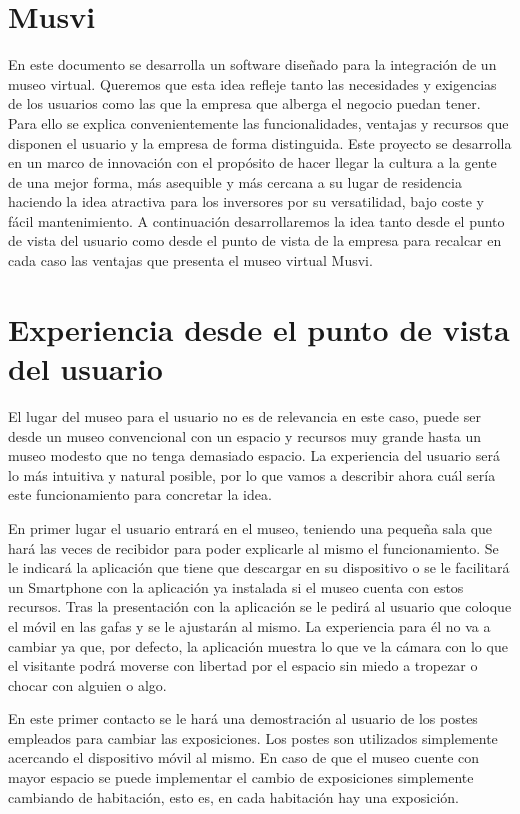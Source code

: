 \documentclass[a4paper,11pt]{article}
\begin{document}
\newpage

\tableofcontents

\newpage

\section{Musvi}
En este documento se desarrolla un software diseñado para la integración de un museo virtual. Queremos que esta idea refleje tanto las necesidades y exigencias de los usuarios como las que la empresa que alberga el negocio puedan tener. Para ello se explica convenientemente las funcionalidades, ventajas y recursos que disponen el usuario y la empresa de forma distinguida. Este proyecto se desarrolla en un marco de innovación con el propósito de hacer llegar la cultura a la gente de una mejor forma, más asequible y más cercana a su lugar de residencia haciendo la idea atractiva para los inversores por su versatilidad, bajo coste y fácil mantenimiento. A continuación desarrollaremos la idea tanto desde el punto de vista del usuario como desde el punto de vista de la empresa para recalcar en cada caso las ventajas que presenta el museo virtual Musvi.

\section{Experiencia desde el punto de vista del usuario}
El lugar del museo para el usuario no es de relevancia en este caso, puede ser desde un museo convencional con un espacio y recursos muy grande hasta un museo modesto que no tenga demasiado espacio. La experiencia del usuario será lo más intuitiva y natural posible, por lo que vamos a describir ahora cuál sería este funcionamiento para concretar la idea.

En primer lugar el usuario entrará en el museo, teniendo una pequeña sala que hará las veces de recibidor para poder explicarle al mismo el funcionamiento. Se le indicará la aplicación que tiene que descargar en su dispositivo o se le facilitará un Smartphone con la aplicación ya instalada si el museo cuenta con estos recursos. Tras la presentación con la aplicación se le pedirá al usuario que coloque el móvil en las gafas y se le ajustarán al mismo. La experiencia para él no va a cambiar ya que, por defecto, la aplicación muestra lo que ve la cámara con lo que el visitante podrá moverse con libertad por el espacio sin miedo a tropezar o chocar con alguien o algo.

En este primer contacto se le hará una demostración al usuario de los postes empleados para cambiar las exposiciones. Los postes son utilizados simplemente acercando el dispositivo móvil al mismo. En caso de que el museo cuente con mayor espacio se puede implementar el cambio de exposiciones simplemente cambiando de habitación, esto es, en cada habitación hay una exposición.
\end{document}
